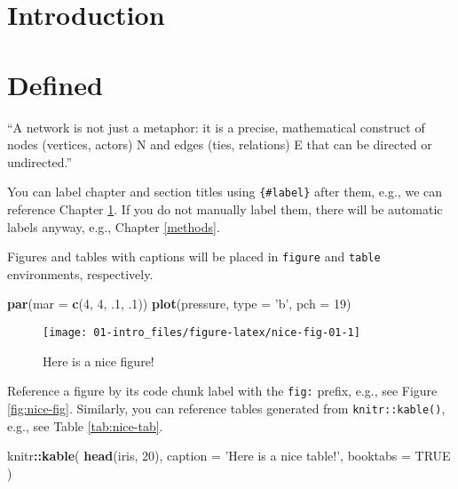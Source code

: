 \documentclass[]{book}
\newenvironment{Shaded}{\begin{snugshade}}{\end{snugshade}}
\newcommand{\DataTypeTok}[1]{\textcolor[rgb]{0.13,0.29,0.53}{#1}}
\newcommand{\DecValTok}[1]{\textcolor[rgb]{0.00,0.00,0.81}{#1}}
\newcommand{\FloatTok}[1]{\textcolor[rgb]{0.00,0.00,0.81}{#1}}
\newcommand{\KeywordTok}[1]{\textcolor[rgb]{0.13,0.29,0.53}{\textbf{#1}}}
\newcommand{\NormalTok}[1]{#1}
\newcommand{\OperatorTok}[1]{\textcolor[rgb]{0.81,0.36,0.00}{\textbf{#1}}}
\newcommand{\OtherTok}[1]{\textcolor[rgb]{0.56,0.35,0.01}{#1}}
\newcommand{\StringTok}[1]{\textcolor[rgb]{0.31,0.60,0.02}{#1}}
\begin{document}
\hypertarget{intro}{%
\chapter{Introduction}\label{intro}}

\hypertarget{defined}{%
\chapter{Defined}\label{defined}}

``A network is not just a metaphor: it is a precise, mathematical construct of nodes (vertices, actors) N and edges (ties, relations) E that can be directed or undirected.'' \citep{jasneyIntroductionSocialNetwork2018}

You can label chapter and section titles using \texttt{\{\#label\}} after them, e.g., we can reference Chapter \ref{intro}. If you do not manually label them, there will be automatic labels anyway, e.g., Chapter \ref{methods}.

Figures and tables with captions will be placed in \texttt{figure} and \texttt{table} environments, respectively.

\begin{Shaded}
\begin{Highlighting}[]
\KeywordTok{par}\NormalTok{(}\DataTypeTok{mar =} \KeywordTok{c}\NormalTok{(}\DecValTok{4}\NormalTok{, }\DecValTok{4}\NormalTok{, }\FloatTok{.1}\NormalTok{, }\FloatTok{.1}\NormalTok{))}
\KeywordTok{plot}\NormalTok{(pressure, }\DataTypeTok{type =} \StringTok{'b'}\NormalTok{, }\DataTypeTok{pch =} \DecValTok{19}\NormalTok{)}
\end{Highlighting}
\end{Shaded}

\begin{figure}

{\centering \texttt{[image: 01-intro\_files/figure-latex/nice-fig-01-1]} 

}

\caption{Here is a nice figure!}\label{fig:nice-fig-01}
\end{figure}

Reference a figure by its code chunk label with the \texttt{fig:} prefix, e.g., see Figure \ref{fig:nice-fig}. Similarly, you can reference tables generated from \texttt{knitr::kable()}, e.g., see Table \ref{tab:nice-tab}.

\begin{Shaded}
\begin{Highlighting}[]
\NormalTok{knitr}\OperatorTok{::}\KeywordTok{kable}\NormalTok{(}
  \KeywordTok{head}\NormalTok{(iris, }\DecValTok{20}\NormalTok{), }\DataTypeTok{caption =} \StringTok{'Here is a nice table!'}\NormalTok{,}
  \DataTypeTok{booktabs =} \OtherTok{TRUE}
\NormalTok{)}
\end{Highlighting}
\end{Shaded}
\end{document}
